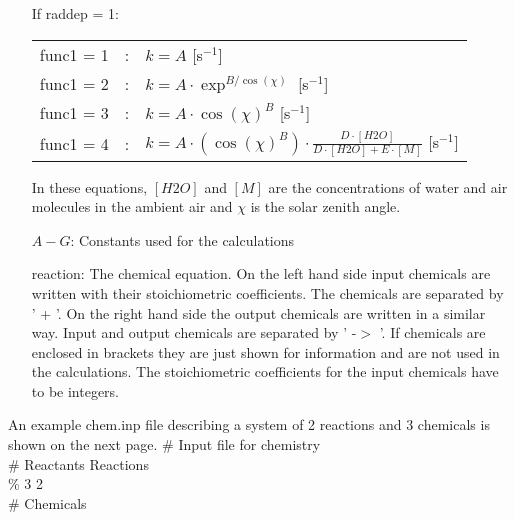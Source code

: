\documentclass[twoside,11pt,fleqn,a4paper,english,openright]{report}
\begin{document}
\begin{itemize}
				If raddep = 1:\\
				\begin{tabular}{lcl}
				func1 = 1 & : & $k=A$ [s$^{-1}$]\\
				func1 = 2 & : & $k=A \cdot \exp^{B / \cos(\chi)}$ [s$^{-1}$]\\
				func1 = 3 & : & $k=A \cdot \cos(\chi)^{B}$ [s$^{-1}$]\\
				func1 = 4 & : & $k=A \cdot (\cos(\chi)^B) \cdot \frac{D \cdot [H2O] }{ D \cdot [H2O] + E \cdot [M]}$ [s$^{-1}$]\\
				\end{tabular}
				$\,$\\$\,$\\
				In these equations, $[H2O]$ and $[M]$ are the concentrations of water and air molecules in the ambient air and 			$\chi$ is the solar zenith angle.\\
\item[$A - G$:]	Constants used for the calculations
\item[reaction:] The chemical equation. On the left hand side input chemicals are written with their stoichiometric coefficients. The chemicals are separated by ' + '. On the right hand side the output chemicals are written in a similar way. Input and output chemicals are separated by ' -$>$ '. If chemicals are enclosed in brackets they are just shown for information and are not used in the calculations. The stoichiometric coefficients for the input chemicals have to be integers.
\end{itemize}
An example chem.inp file describing a system of 2 reactions and 3 chemicals is shown on the next page.
\newpage
\# Input file for chemistry\\
\# Reactants Reactions\\
\% 3 2\\
\# Chemicals\\
   \\
\makebox[0.3 cm][l]{}   \\
\makebox[0.3 cm][l]{}   \\
\makebox[0.3 cm][l]{}   \\
\makebox[0.3 cm][l]{}   \\
\end{document}
